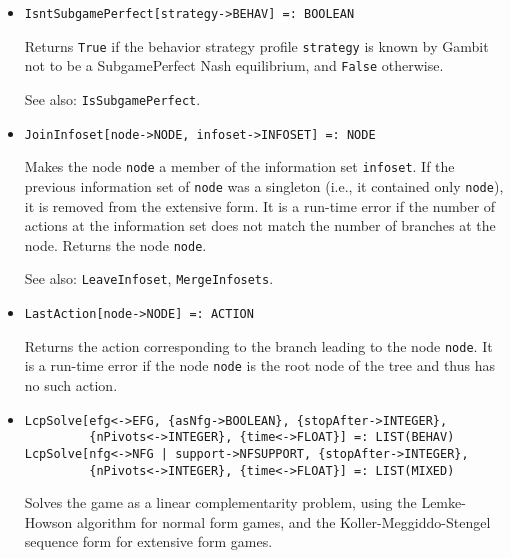 \begin{itemize}
\item
\protect \large \begin{verbatim}
IsntSubgamePerfect[strategy->BEHAV] =: BOOLEAN
\end{verbatim}\normalsize

\bd Returns \verb+True+ if the behavior strategy profile
\verb+strategy+ is known by Gambit not to be a SubgamePerfect Nash
equilibrium, and \verb+False+ otherwise. 
\item
[See also:] {\tt IsSubgamePerfect}.
\ed


\item
\protect \large \begin{verbatim}
JoinInfoset[node->NODE, infoset->INFOSET] =: NODE
\end{verbatim}\normalsize

\bd
Makes the node \verb+node+ a member of the information set
\verb+infoset+.  If the previous information set of \verb+node+ was
a singleton (i.e., it contained only \verb+node+), it is removed from the
extensive form.  It is a run-time error if the number of actions at the
information set does not match the number of branches at the node.
Returns the node \verb+node+.
\item
[See also:] {\tt LeaveInfoset}, {\tt MergeInfosets}.
\ed



\item
\protect \large \begin{verbatim} 
LastAction[node->NODE] =: ACTION
\end{verbatim}\normalsize

\bd
Returns the action corresponding to the branch leading to
the node \verb+node+.  It is a run-time error if the node \verb+node+ is
the root node of the tree and thus has no such action.
\ed

\item
\protect \large \begin{verbatim}
LcpSolve[efg<->EFG, {asNfg->BOOLEAN}, {stopAfter->INTEGER},
         {nPivots<->INTEGER}, {time<->FLOAT}] =: LIST(BEHAV)
LcpSolve[nfg<->NFG | support->NFSUPPORT, {stopAfter->INTEGER},
         {nPivots<->INTEGER}, {time<->FLOAT}] =: LIST(MIXED)
\end{verbatim}\normalsize

\bd
Solves the game as a linear complementarity problem, using the
Lemke-Howson algorithm for normal form games, and the
Koller-Meggiddo-Stengel sequence form for extensive form games.  



\end{itemize}

